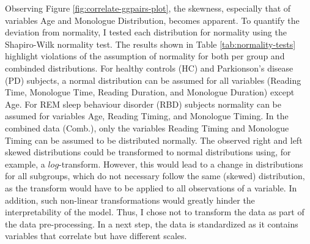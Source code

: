 \documentclass[
  english,
  doc,floatsintext]{apa6}
\newenvironment{Shaded}{\begin{snugshade}}{\end{snugshade}}
\newcommand{\FunctionTok}[1]{\textcolor[rgb]{0.00,0.00,0.00}{#1}}
\newcommand{\NormalTok}[1]{#1}
\newcommand{\OtherTok}[1]{\textcolor[rgb]{0.56,0.35,0.01}{#1}}
\newcommand{\SpecialCharTok}[1]{\textcolor[rgb]{0.00,0.00,0.00}{#1}}
\begin{document}
Observing Figure \ref{fig:correlate-ggpairs-plot}, the skewness, especially that
of variables Age and Monologue Distribution, becomes apparent. To quantify the deviation from normality,
I tested each distribution for normality using the Shapiro-Wilk normality test. The results shown in
Table \ref{tab:normality-tests} highlight violations of the assumption of normality for both per group
and combinded distributions. For healthy controls (HC) and Parkionson's disease (PD) subjects,
a normal distribution can be assumed for all variables (Reading Time, Monologue Time, Reading Duration,
and Monologue Duration) except Age. For REM sleep behaviour disorder (RBD) subjects normality can
be assumed for variables Age, Reading Timing, and Monologue Timing. In the combined data (Comb.),
only the variables Reading Timing and Monologue Timing can be assumed to be distributed normally.
The observed right and left skewed distributions could be transformed to normal distributions using, for
example, a \(log\)-transform. However, this would lead to a change in distributions for all subgroups,
which do not necessary follow the same (skewed) distribution, as the transform would have to be applied
to all observations of a variable. In addition, such non-linear transformations would greatly hinder the
interpretability of the model. Thus, I chose not to transform the data as part of the data pre-processing.
In a next step, the data is standardized as it contains variables that correlate but have different scales.

\begin{Shaded}
\end{Shaded}
\end{document}
